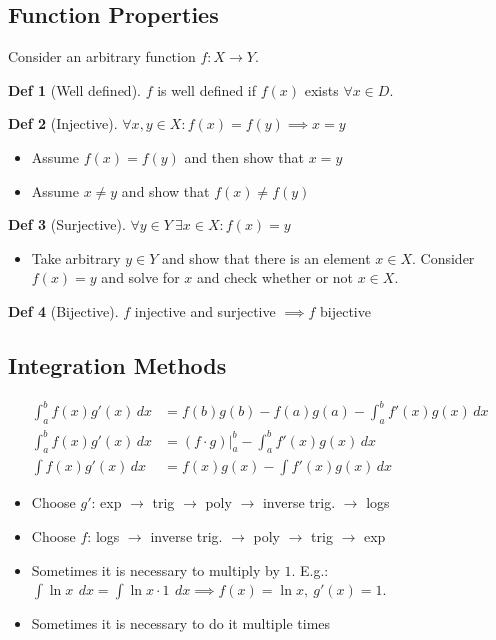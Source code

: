 \documentclass[a4paper, 10pt]{article}
\theoremstyle{definition}
\newtheorem*{definition}{Def}
\begin{document}
\subsection*{Function Properties}
Consider an arbitrary function $f: X \to Y$.
\begin{definition}[Well defined]
    $f$ is well defined if $f(x)$ exists $\forall x \in D$.
\end{definition}

\begin{definition}[Injective]
    $\forall x, y \in X: f(x) = f(y) \implies x = y$
    \begin{itemize}
        \item Assume $f(x)= f(y)$ and then show that $x = y$
        \item Assume $x \neq y$ and show that $f(x) \neq f(y)$
    \end{itemize}
\end{definition}

\begin{definition}[Surjective]
    $\forall y \in Y \ \exists x \in X: f(x) = y$
    \begin{itemize}
        \item Take arbitrary $y \in Y$ and show that there is an element $x \in X$. Consider $f(x) = y$ and solve for $x$ and check whether or not $x \in X$.
    \end{itemize}
\end{definition}

\begin{definition}[Bijective]
    $f$ injective and surjective $\implies f$ bijective
\end{definition}

\subsection*{Integration Methods}
\begin{ntheorem*}
    \begin{align*}
        \int_a^b f(x) g'(x) \,dx &= f(b)g(b) - f(a)g(a) - \int_a^b f'(x)g(x) \,dx \\
        \int_a^b f(x) g'(x) \,dx &= (f \cdot g)|_a^b - \int_a^b f'(x)g(x) \,dx \\
        \int f(x)g'(x) \,dx &= f(x) g(x) - \int f'(x) g(x) \,dx
    \end{align*}
\end{ntheorem*}
\begin{itemize}
    \item Choose $g'$: exp $\rightarrow$ trig $\rightarrow$ poly $\rightarrow$ inverse trig. $\rightarrow$ logs
    \item Choose $f$: logs $\rightarrow$ inverse trig. $\rightarrow$ poly $\rightarrow$ trig $\rightarrow$ exp
    \item Sometimes it is necessary to multiply by $1$. E.g.: $\int \ln x \ \,dx = \int \ln x \cdot 1 \ \,dx \implies f(x) = \ln x, \ g'(x) = 1$.
    \item Sometimes it is necessary to do it multiple times
\end{itemize}
\end{document}
